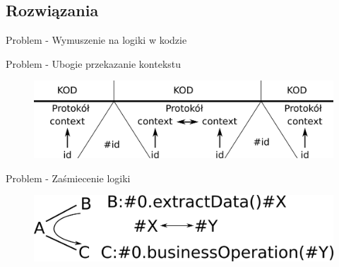 \documentclass[smaller]{beamer}
\begin{document}

\subsection{Rozwiązania}
\begin{frame}{Problem - Wymuszenie na logiki w kodzie}

\LstLogicDropSolution

\end{frame}


\begin{frame}{Problem - Ubogie przekazanie kontekstu}
\begin{figure}
 \centering
 \includegraphics[width=1\textwidth]{contextMapSolutionFig}
\end{figure}
\end{frame}

\begin{frame}{Problem - Zaśmiecenie logiki}
\LstLogicGarbage

\begin{figure}
 \centering
 \includegraphics[width=1\textwidth]{logicGarbageSimpleSolutionFig}
\end{figure}
\end{frame}

\end{document}
